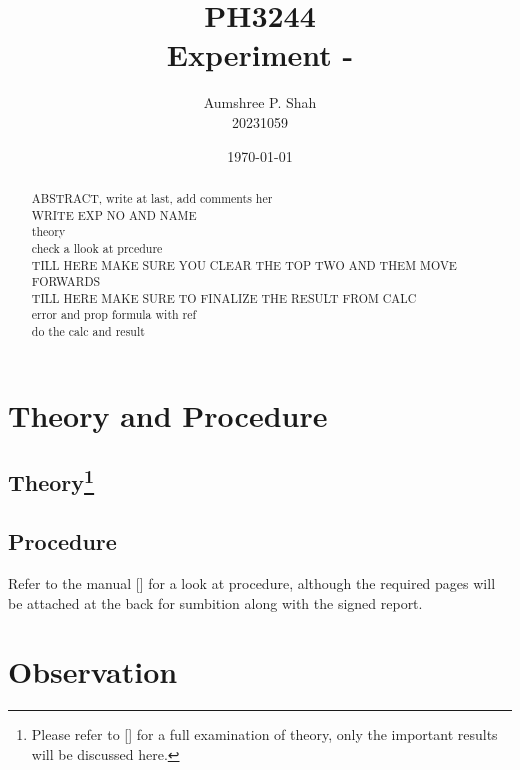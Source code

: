 \documentclass[%
sor,
 jor,
 amsmath,amssymb,
 reprint,
]{revtex4-2}
\begin{document}
\title{PH3244\\Experiment - \\ }
\author{Aumshree P. Shah\\20231059}
\date{\today}
\begin{abstract}
	ABSTRACT,  write at last, add comments her
\\WRITE EXP NO AND NAME
\\theory
\\check a llook at prcedure
\\ TILL HERE MAKE SURE YOU CLEAR THE TOP TWO AND THEM MOVE FORWARDS
\\ TILL HERE MAKE SURE TO FINALIZE THE RESULT FROM CALC
\\error and prop formula with ref
\\do the calc and result
\centering
\end{abstract}
\maketitle
\tableofcontents
\vspace*{\fill}
\pagebreak
\pagebreak
\section{Theory and Procedure}
	\subsection{Theory\footnote{Please refer to [\cite{ph3244repo}] for a full examination of theory, only the important results will be discussed here.}}

\subsection{Procedure}Refer to the manual [\cite{ph3244repo}] for a look at procedure, although the required pages will be attached at the back for sumbition along with the signed report.

\section{Observation}
\end{document}
